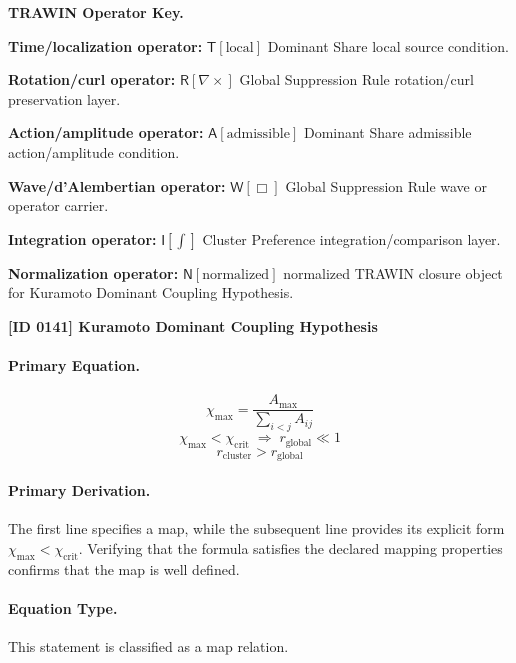 \par\vspace{0.45\baselineskip}
\noindent\begin{minipage}[t]{\linewidth}
\begingroup
\small
\raggedright
\textbf{TRAWIN Operator Key.}\par
\noindent\textbf{Time/localization operator:} $\mathsf{T}\!\left[\mathrm{local}\right]$ Dominant Share local source condition.\par
\noindent\textbf{Rotation/curl operator:} $\mathsf{R}\!\left[\nabla\times\right]$ Global Suppression Rule rotation/curl preservation layer.\par
\noindent\textbf{Action/amplitude operator:} $\mathsf{A}\!\left[\mathrm{admissible}\right]$ Dominant Share admissible action/amplitude condition.\par
\noindent\textbf{Wave/d'Alembertian operator:} $\mathsf{W}\!\left[\Box\right]$ Global Suppression Rule wave or operator carrier.\par
\noindent\textbf{Integration operator:} $\mathsf{I}\!\left[\int\right]$ Cluster Preference integration/comparison layer.\par
\noindent\textbf{Normalization operator:} $\mathsf{N}\!\left[\mathrm{normalized}\right]$ normalized TRAWIN closure object for Kuramoto Dominant Coupling Hypothesis.\par
\endgroup
\end{minipage}

\clearpage
\noindent\textbf{[ID 0141] Kuramoto Dominant Coupling Hypothesis}\par
\vspace{0.35em}
\paragraph{Primary Equation.}
\[
\chi_{\max}=\frac{A_{\max}}{\sum_{i<j}A_{ij}}
\]
\[
\chi_{\max}<\chi_{\mathrm{crit}}
\;\Longrightarrow\;
r_{\mathrm{global}}\ll 1
\]
\[
r_{\mathrm{cluster}}>r_{\mathrm{global}}
\]

\paragraph{Primary Derivation.}
The first line specifies a map, while the subsequent line provides its explicit form \( \chi_{\max}<\chi_{\mathrm{crit}} \). Verifying that the formula satisfies the declared mapping properties confirms that the map is well defined.
\paragraph{Equation Type.}
This statement is classified as a map relation.

